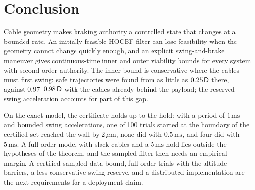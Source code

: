\section{Conclusion}\label{sec:conclusion}
Cable geometry makes braking authority a controlled state that changes at a bounded rate. An initially feasible HOCBF filter can lose feasibility when the geometry cannot change quickly enough, and an explicit swing-and-brake maneuver gives continuous-time inner and outer viability bounds for every system with second-order authority. The inner bound is conservative where the cables must first swing: safe trajectories were found from as little as $0.25\,\mathsf{D}$ there, against $0.97$--$0.98\,\mathsf{D}$ with the cables already behind the payload; the reserved swing acceleration accounts for part of this gap.

On the exact model, the certificate holds up to the hold: with a period of $1\,\mathrm{ms}$ and bounded swing accelerations, one of 100 trials started at the boundary of the certified set reached the wall by $2\,\mu\mathrm m$, none did with $0.5\,\mathrm{ms}$, and four did with $5\,\mathrm{ms}$. A full-order model with slack cables and a $5\,\mathrm{ms}$ hold lies outside the hypotheses of the theorem, and the sampled filter then needs an empirical margin. A certified sampled-data bound, full-order trials with the altitude barriers, a less conservative swing reserve, and a distributed implementation are the next requirements for a deployment claim.
